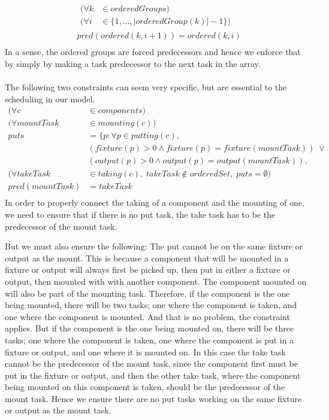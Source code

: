  \begin{equation}
 \begin{aligned}\label{eq:114}
 &\begin{aligned}
 (\forall k &\in orderedGroups) \\
 (\forall i &\in \{1 , \ldots , |orderedGroup(k)|-1\}) 
 \end{aligned}\\
 &pred(ordered(k, i + 1)) = ordered(k, i) \\
 \end{aligned}
 \end{equation}
In a sense, the ordered groups are forced predecessors and hence we enforce that by simply by making a task predecessor to the next task in the array.
\\\\
The following two constraints can seem very specific, but are essential to the scheduling in our model.
 \begin{equation}
 \begin{aligned}\label{eq:112}
 (\forall c &\in components) \\
 (\forall mountTask &\in mounting(c)) \\
 puts &= \{p : \forall p \in putting(c),\\
 &(fixture(p) > 0 \land fixture(p) = fixture(mountTask)) \; \lor  \\
 &(output(p) > 0 \land output(p) = output(mountTask)), \\
 (\forall takeTask &\in taking(c), \; takeTask \notin orderedSet, \; puts = \emptyset) \\
 pred(mountTask) &= takeTask \\
 \end{aligned}
 \end{equation}
 In order to properly connect the taking of a component and the mounting of one, we need to ensure that if there is no put task, the take task has to be the predecessor of the mount task. 
 
 But we must also ensure the following: The put cannot be on the same fixture or output as the mount. This is because a component that will be mounted in a fixture or output will always first be picked up, then put in either a fixture or output, then mounted with with another component. The component mounted on will also be part of the mounting task. Therefore, if the component is the one being mounted, there will be two tasks; one where the component is taken, and one where the component is mounted. And that is no problem, the constraint applies. But if the component is the one being mounted on, there will be three tasks; one where the component is taken, one where the component is put in a fixture or output, and one where it is mounted on. In this case the take task cannot be the predecessor of the mount task, since the component first must be put in the fixture or output, and then the other take task,  where the component being mounted on this component is taken, should be the predecessor of the mount task. Hence we ensure there are no put tasks working on the same fixture or output as the mount task.
 
